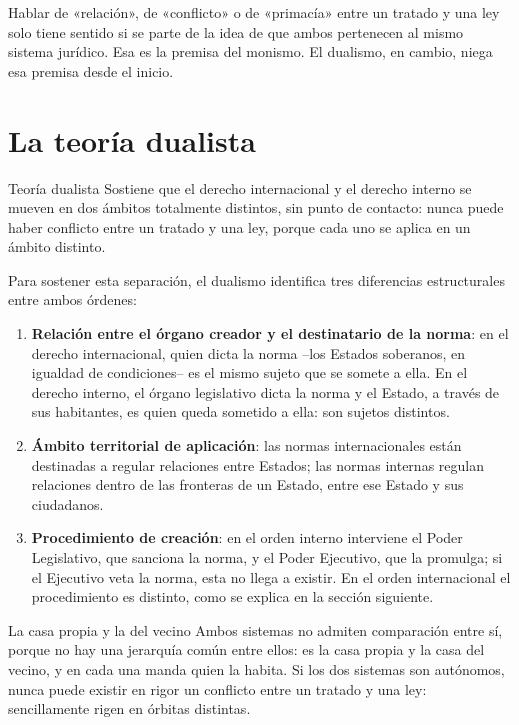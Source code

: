 \documentclass[12pt,oneside]{book}
\begin{document}
\begin{importante}
Hablar de «relación», de «conflicto» o de «primacía» entre un tratado y una ley solo tiene sentido si se parte de la idea de que ambos pertenecen al mismo sistema jurídico. Esa es la premisa del monismo. El dualismo, en cambio, niega esa premisa desde el inicio.
\end{importante}

\section{La teoría dualista}

\begin{definicion}{Teoría dualista}
Sostiene que el derecho internacional y el derecho interno se mueven en dos ámbitos totalmente distintos, sin punto de contacto: nunca puede haber conflicto entre un tratado y una ley, porque cada uno se aplica en un ámbito distinto.
\end{definicion}

Para sostener esta separación, el dualismo identifica tres diferencias estructurales entre ambos órdenes:

\begin{enumerate}
    \item \textbf{Relación entre el órgano creador y el destinatario de la norma}: en el derecho internacional, quien dicta la norma --los Estados soberanos, en igualdad de condiciones-- es el mismo sujeto que se somete a ella. En el derecho interno, el órgano legislativo dicta la norma y el Estado, a través de sus habitantes, es quien queda sometido a ella: son sujetos distintos.
    \item \textbf{Ámbito territorial de aplicación}: las normas internacionales están destinadas a regular relaciones entre Estados; las normas internas regulan relaciones dentro de las fronteras de un Estado, entre ese Estado y sus ciudadanos.
    \item \textbf{Procedimiento de creación}: en el orden interno interviene el Poder Legislativo, que sanciona la norma, y el Poder Ejecutivo, que la promulga; si el Ejecutivo veta la norma, esta no llega a existir. En el orden internacional el procedimiento es distinto, como se explica en la sección siguiente.
\end{enumerate}

\begin{ejemplo}{La casa propia y la del vecino}
Ambos sistemas no admiten comparación entre sí, porque no hay una jerarquía común entre ellos: es la casa propia y la casa del vecino, y en cada una manda quien la habita. Si los dos sistemas son autónomos, nunca puede existir en rigor un conflicto entre un tratado y una ley: sencillamente rigen en órbitas distintas.
\end{ejemplo}
\end{document}
